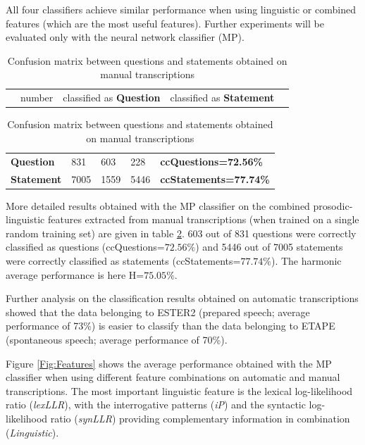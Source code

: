 \documentclass[conference]{IEEEtran}
\begin{document}
All four classifiers achieve similar performance when using linguistic or combined features (which are the most useful features). 
Further experiments will be evaluated only with the neural network classifier (MP).


\begin{table}[b!]
\renewcommand{\arraystretch}{1.3}
\caption{Confusion matrix between questions and statements obtained on manual transcriptions}
\label{Tab:cMatrix}
\centering
\begin{tabular}{p{1.01cm}|p{0.7cm}|p{1.3cm}|p{1.3cm}|p{2cm}}
\cline{2-4}
& number & classified as \textbf{Question} & classified as \textbf{Statement} &   \\
\end{tabular}

\begin{tabular}{|p{1cm}|p{0.7cm}|p{1.3cm}|p{1.3cm}|p{2cm}}
\cline{1-4}
\textbf{Question}  &  831 & 603 & 228   & \textbf{ccQuestions=72.56\%} \\ \cline{1-4}
\textbf{Statement} & 7005 & 1559 & 5446  & \textbf{ccStatements=77.74\%} \\ \cline{1-4}
\end{tabular}
\end{table}


More detailed results obtained with the MP classifier on the combined prosodic-linguistic features extracted from manual transcriptions (when trained on a single random training set) are given in table \ref{Tab:cMatrix}.
603 out of 831 questions were correctly classified as questions (ccQuestions=$72.56\%$) and 5446 out of 7005 statements were correctly classified as statements (ccStatements=$77.74\%$). 
The harmonic average performance is here H=$75.05\%$. 

Further analysis on the classification results obtained on automatic transcriptions showed that the data belonging to ESTER2 (prepared speech; average performance of 73\%)  is easier to classify than the data belonging to ETAPE (spontaneous speech; average performance of 70\%).


Figure \ref{Fig:Features} shows the average performance obtained with the MP classifier when using different feature combinations on automatic and manual transcriptions. The most important linguistic feature is the lexical log-likelihood ratio ({\it lexLLR}), with the interrogative patterns ({\it iP}) and the syntactic log-likelihood ratio ({\it synLLR}) providing complementary information in combination ({\it Linguistic}). 
 
\end{document}

